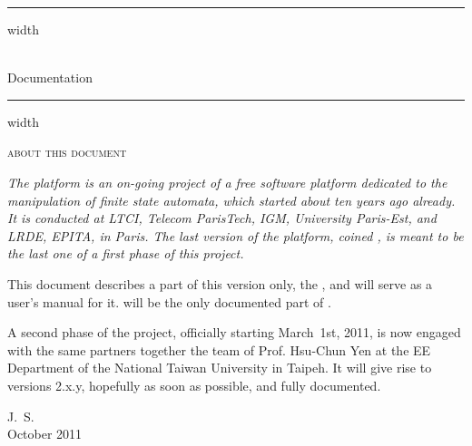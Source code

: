 \vspace*{20pt}
\vskip4pt \hrule height 4pt width \hsize \vskip4pt
\begin{center}
  \Huge 
  \vcsnv\\
  \tafkit Documentation
\end{center}
\vspace*{-1.5ex}
\vskip4pt \hrule height 4pt width \hsize \vskip4pt
\vspace*{20pt}
\vfill

    \begin{center}
        \textsc{about this document}
    \end{center}

{\itshape 
The \vcsn platform is an on-going project of a free
software platform dedicated to the manipulation of finite state
automata, which started about ten years ago already. 
It is 
conducted at LTCI, Telecom ParisTech, IGM, University Paris-Est, and 
LRDE, EPITA, in Paris.
The last version of the platform, coined \vcsnv, is meant to be the 
last one of a first phase of this project.

This document describes a part of this version only, the \tafkit, and 
will serve as a user's manual for it.
\tafkit will be the only 
documented part of \vcsnv.

A second phase of the project, officially starting March~1st, 2011, 
is now engaged with the same partners together the team of Prof. 
Hsu-Chun Yen at the EE Department of the National Taiwan University 
in Taipeh.
It will give rise to versions \vcsn 2.x.y, hopefully as soon as 
possible, and fully documented.


\begin{flushright}
    J.~S.\\
    October 2011    
\end{flushright}
}%
% 
% 
% 
% 
% 
% 
\vfill
    
